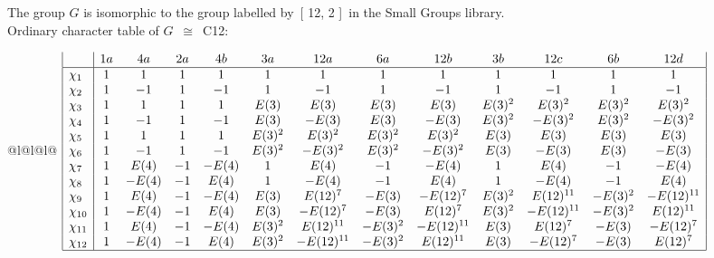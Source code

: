 \documentclass[varwidth=\maxdimen,border=10]{standalone}
\begin{document}
The group $G$ is isomorphic to the group labelled by\ [ 12, 2 ]\ in the Small Groups library.\\
Ordinary character table of $G$\ $\cong$\ C12:\\
\begin{center}
\begin{tabular}{@{}l@{}l@{}l@{}}
\hline
\(\begin{array}{|l|cccccccccccc|}
  & 1a & 4a & 2a & 4b & 3a & 12a & 6a & 12b & 3b & 12c & 6b & 12d\\ \hline
\chi_{1} & 1 & 1 & 1 & 1 & 1 & 1 & 1 & 1 & 1 & 1 & 1 & 1\\
\chi_{2} & 1 & -1 & 1 & -1 & 1 & -1 & 1 & -1 & 1 & -1 & 1 & -1\\
\chi_{3} & 1 & 1 & 1 & 1 & E(3) & E(3) & E(3) & E(3) & E(3)^{2} & E(3)^{2} & E(3)^{2} & E(3)^{2}\\
\chi_{4} & 1 & -1 & 1 & -1 & E(3) & -E(3) & E(3) & -E(3) & E(3)^{2} & -E(3)^{2} & E(3)^{2} & -E(3)^{2}\\
\chi_{5} & 1 & 1 & 1 & 1 & E(3)^{2} & E(3)^{2} & E(3)^{2} & E(3)^{2} & E(3) & E(3) & E(3) & E(3)\\
\chi_{6} & 1 & -1 & 1 & -1 & E(3)^{2} & -E(3)^{2} & E(3)^{2} & -E(3)^{2} & E(3) & -E(3) & E(3) & -E(3)\\
\chi_{7} & 1 & E(4) & -1 & -E(4) & 1 & E(4) & -1 & -E(4) & 1 & E(4) & -1 & -E(4)\\
\chi_{8} & 1 & -E(4) & -1 & E(4) & 1 & -E(4) & -1 & E(4) & 1 & -E(4) & -1 & E(4)\\
\chi_{9} & 1 & E(4) & -1 & -E(4) & E(3) & E(12)^{7} & -E(3) & -E(12)^{7} & E(3)^{2} & E(12)^{11} & -E(3)^{2} & -E(12)^{11}\\
\chi_{10} & 1 & -E(4) & -1 & E(4) & E(3) & -E(12)^{7} & -E(3) & E(12)^{7} & E(3)^{2} & -E(12)^{11} & -E(3)^{2} & E(12)^{11}\\
\chi_{11} & 1 & E(4) & -1 & -E(4) & E(3)^{2} & E(12)^{11} & -E(3)^{2} & -E(12)^{11} & E(3) & E(12)^{7} & -E(3) & -E(12)^{7}\\
\chi_{12} & 1 & -E(4) & -1 & E(4) & E(3)^{2} & -E(12)^{11} & -E(3)^{2} & E(12)^{11} & E(3) & -E(12)^{7} & -E(3) & E(12)^{7}\\
\hline
\end{array}\)\\
\end{tabular}
\end{center}
\end{document}
